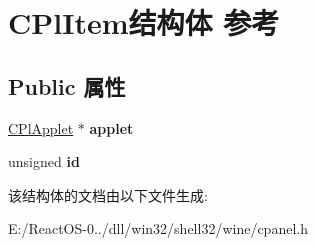 \hypertarget{struct_c_pl_item}{}\section{C\+Pl\+Item结构体 参考}
\label{struct_c_pl_item}
\subsection*{Public 属性}
\begin{DoxyCompactItemize}
\item 
\mbox{\label{struct_c_pl_item_ae7e77e647354dd1883bc0d96cd7d29ec}} 
\hyperlink{struct_c_pl_applet}{C\+Pl\+Applet} $\ast$ {\bfseries applet}
\item 
\mbox{\label{struct_c_pl_item_a349e3834c89692b83ddf6439f74ab1a6}} 
unsigned {\bfseries id}
\end{DoxyCompactItemize}


该结构体的文档由以下文件生成\+:\begin{DoxyCompactItemize}
\item 
E\+:/\+React\+O\+S-\/0../dll/win32/shell32/wine/cpanel.\+h\end{DoxyCompactItemize}
